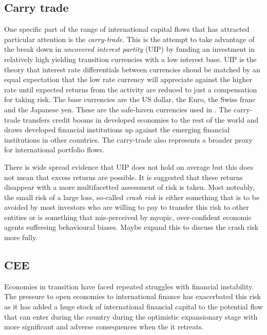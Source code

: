 \documentclass[12pt, a4paper, oneside]{article} %
\begin{document}
\subsection{Carry trade}
One specific part of the range of international capital flows that has attracted particular attention is the \emph{carry-trade}.  This is the attempt to take advantage of the break down in \emph{uncovered interest partity} (UIP) by funding an investment in relatively high yielding transition currencies with a low interest base.  UIP is the theory that interest rate differentials between currencies shoud be matched by an equal expectation that the low rate currency will appreciate against the higher rate until expected returns from the activity are reduced to just a compensation for taking risk. The base currencies are the US dollar, the Euro, the Swiss franc and the Japanese yen.  These are the safe-haven currencies used in \citet{HabibStracca}.  The carry-trade transfers credit booms in developed economies to the rest of the world and draws developed financial institutions up against the emerging financial institutions in other countries. The carry-trade also represents a broader proxy for international portfolio flows.   

There is wide spread evidence that UIP does not hold on average but this does not mean that excess returns are possible.  It is suggested that these returns disappear with a more multifacetted assessment of risk is taken.  Most noteably, the small risk of a large loss, so-called \emph{crash risk} is either something that is to be avoided by most investors who are willing to pay to transfer this risk to other entities or is something that mis-perceived by myopic, over-confident economic agents suffereing behavioural biases.  Maybe expand this to discuss the crash risk more fully. 


\subsection{CEE}
Economies in transition have faced repeated struggles with financial instability.  The pressure to open economies to international finance has exacerbated this risk as it has added a huge stock of international financial capital to the potential flow that can enter during the country during the optimistic expansionary stage with more significant and adverse consequences when the it retreats.
\end{document}
